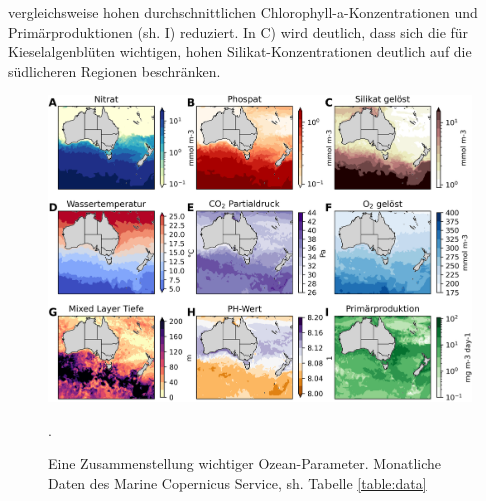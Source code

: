 \documentclass[12pt,a4paper,onecolumn,headheight=30pt]{scrartcl}
\begin{document}
vergleichsweise hohen durchschnittlichen Chlorophyll-a-Konzentrationen und Primärproduktionen (sh. I) reduziert. In C) wird deutlich, dass sich die für Kieselalgenblüten wichtigen, hohen Silikat-Konzentrationen deutlich auf die südlicheren Regionen beschränken.
\begin{figure}[htbp]
\includegraphics[width=\textwidth]{bilder/factors_collage.png}
\caption{Eine Zusammenstellung wichtiger Ozean-Parameter. Monatliche Daten des  Marine Copernicus Service, sh. Tabelle \ref{table:data}}. \label{fig:factors_collage}
\end{figure}
\end{document}
